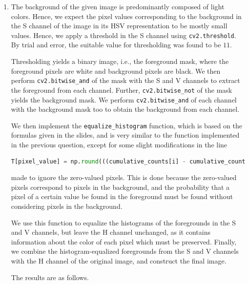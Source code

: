 \documentclass{article}[a4paper]
\begin{document}
\begin{enumerate}
	\item The background of the given image is predominantly composed of light colors. Hence, we expect the pixel values corresponding
	to the background in the S channel of the image in its HSV representation to be mostly small values. Hence, we apply a threshold in
	the S channel using \lstinline|cv2.threshold|. By trial and error, the suitable value for thresholding was found to be $11$.

	Thresholding yields a binary image, i.e., the foreground mask, where the foreground pixels are white and background pixels are black.
	We then perform \lstinline|cv2.bitwise_and| of the mask with the S and V channels to extract the foreground from each channel. Further,
	\lstinline|cv2.bitwise_not| of the mask yields the background mask. We perform \lstinline|cv2.bitwise_and| of each channel with the 
	background mask too to obtain the background from each channel.

	We then implement the \lstinline|equalize_histogram| function, which is based on the formulas given in the slides, and is very
	similar to the function implemented in the previous question, except for some slight modifications in the line
	\begin{lstlisting}[language=Python]
T[pixel_value] = np.round(((cumulative_counts[i] - cumulative_counts[0]) / (cumulative_counts[-1] - cumulative_counts[0]) ) * 255),
	\end{lstlisting}
	made to ignore the zero-valued pixels. This is done because the zero-valued pixels correspond to pixels in the background, and the
	probability that a pixel of a certain value be found in the foreground must be found without considering pixels in the background.

	We use this function to equalize the histograms of the foregrounds in the S and V channels, but leave the H channel unchanged, as it
	contains information about the color of each pixel which must be preserved. Finally, we combine the histogram-equalized foregrounds
	from the S and V channels with the H channel of the original image, and construct the final image.

	The results are as follows.


\end{enumerate}
\end{document}

